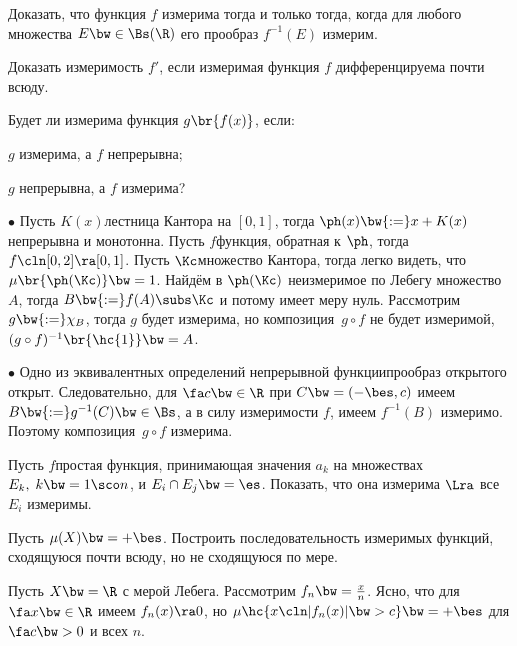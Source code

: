 \documentclass[a4paper,draft]{article}
\begin{document}
\begin{problem}
  Доказать, что функция $f$ измерима тогда и только тогда, когда для любого
  множества $E \bw\in \Bs(\R)$ его прообраз $f^{-1}(E)$ измерим.
\end{problem}

\begin{problem}
  Доказать измеримость $f'$, если измеримая функция $f$ дифференцируема почти всюду.
\end{problem}

\begin{problem}
  Будет ли измерима функция $g\br{f(x)}$, если:
  \begin{items}{-3}
    \item $g$ измерима, а $f$ непрерывна;
    \item $g$ непрерывна, а $f$ измерима?
  \end{items}
\end{problem}
\begin{solution}

  $\bullet$ Пусть $K(x)$\т лестница Кантора на $[0,1]$, тогда $\ph(x) \bw{:=} x + K(x)$
  непрерывна и монотонна. Пусть $f$\т функция, обратная к $\ph$, тогда $f\cln [0,2] \ra [0,1]$.
  Пусть $\Kc$\т множество Кантора, тогда легко видеть, что $\mu\br{\ph(\Kc)} \bw= 1$. Найдём
  в $\ph(\Kc)$ неизмеримое по Лебегу множество~$A$, тогда $B \bw{:=} f(A) \subs \Kc$ и потому
  имеет меру нуль. Рассмотрим $g \bw{:=} \chi_B$, тогда $g$ будет измерима, но композиция~$g\circ f$
  не будет измеримой,  $(g\circ f)^{-1}\br{\hc{1}} \bw= A$.

  $\bullet$ Одно из эквивалентных определений непрерывной функции\т прообраз открытого открыт.
  Следовательно, для $\fa c \bw\in \R$ при $C \bw= (-\bes, c)$ имеем
  $B \bw{:=} g^{-1}(C) \bw\in \Bs$, а в силу измеримости $f$, имеем $f^{-1}(B)$ измеримо.
  Поэтому композиция~$g\circ f$ измерима.
\end{solution}

\begin{problem}
  Пусть $f$\т простая функция, принимающая значения $a_k$ на множествах $E_k, \; k\bw=1\sco n$, и
  $E_i \cap E_j \bw= \es$. Показать, что она измерима $\Lra$ все $E_i$ измеримы.
\end{problem}

\begin{problem}
  Пусть $\mu(X) \bw= +\bes$. Построить последовательность измеримых функций, сходящуюся почти всюду,
  но не сходящуюся по мере.
\end{problem}
\begin{solution}
  Пусть $X \bw= \R$ с мерой Лебега. Рассмотрим $f_n \bw= \frac xn$. Ясно, что для $\fa x \bw\in \R$
  имеем $f_n(x) \ra 0$, но $\mu\hc{x\cln |f_n(x)| \bw> c} \bw= +\bes$ для $\fa c \bw> 0$ и всех $n$.
\end{solution}
\end{document}
